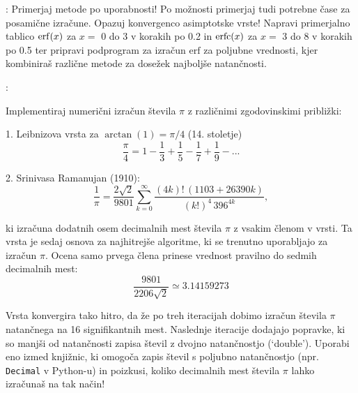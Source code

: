 \documentclass[12pt]{article}
\begin{document}
\medskip

:
Primerjaj metode po uporabnosti! Po možnosti primerjaj tudi potrebne čase za posamične izračune. Opazuj konvergenco asimptotske vrste!
Napravi primerjalno tablico ${\rm erf}(x)$ za $x=$ 0 do 3 v korakih po 0.2 in ${\rm erfc}(x)$ za $x=$ 3 do 8 v korakih po 
0.5 ter pripravi podprogram za izračun $\mathrm{erf}$ za poljubne vrednosti, kjer kombiniraš različne metode za dosežek najboljše natančnosti.

\medskip

:

Implementiraj numerični izračun števila $\pi$ z različnimi zgodovinskimi približki:

1. Leibnizova vrsta za $\arctan{(1)} = \pi / 4$ (14. stoletje)
\[
    \frac{\pi}{4} = 1 - \frac{1}{3} + \frac{1}{5} - \frac{1}{7} + \frac{1}{9} - ...
\]

2. Srinivasa Ramanujan (1910):
\[
    \frac{1}{\pi} = \frac{2\sqrt{2}}{9801} \sum_{k=0}^{\infty} \frac{(4k)! \, (1103 + 26390k)}{(k!)^4 \, 396^{4k}},
\]

ki izračuna dodatnih osem decimalnih mest števila $\pi$ z vsakim členom v vrsti. Ta vrsta je sedaj osnova za najhitrejše algoritme, ki se trenutno uporabljajo za izračun $\pi$. Ocena samo prvega člena prinese vrednost pravilno do sedmih decimalnih mest:
\[
    \frac{9801}{2206\sqrt{2}} \simeq 3.14159273
\]

Vrsta konvergira tako hitro, da že po treh iteracijah dobimo izračun števila $\pi$ natančnega na 16 signifikantnih mest. Naslednje iteracije dodajajo popravke, ki so manjši od natančnosti zapisa števil z dvojno natančnostjo (`double'). Uporabi eno izmed knjižnic, ki omogoča zapis števil s poljubno natančnostjo (npr. \texttt{Decimal} v Python-u) in poizkusi, koliko decimalnih mest števila $\pi$ lahko izračunaš na tak način!
\end{document}
